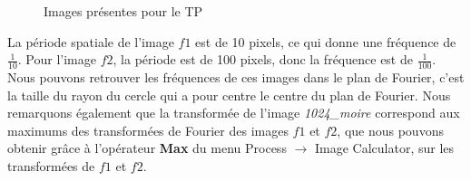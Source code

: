 \documentclass[a4paper,11pt]{article}
\begin{document}
  \begin{figure}[H]
   \centering
   \caption{Images présentes pour le TP}
  \end{figure}

  La période spatiale de l’image $f1$ est de 10 pixels, ce qui donne une fréquence de $\frac{1}{10}$. Pour l’image $f2$, la période est de 100 pixels, 
  donc la fréquence est de $\frac{1}{100}$. Nous pouvons retrouver les fréquences de ces images dans le plan de Fourier, c’est la taille du rayon du cercle 
  qui a pour centre le centre du plan de Fourier. Nous remarquons également que la transformée de l’image \textit{1024\_moire} correspond aux maximums  
  des transformées de Fourier des images $f1$ et $f2$, que nous pouvons obtenir grâce à l’opérateur \textbf{Max} du menu Process $\rightarrow$ Image Calculator, 
  sur les transformées de $f1$ et $f2$.\\
  
\end{document}
